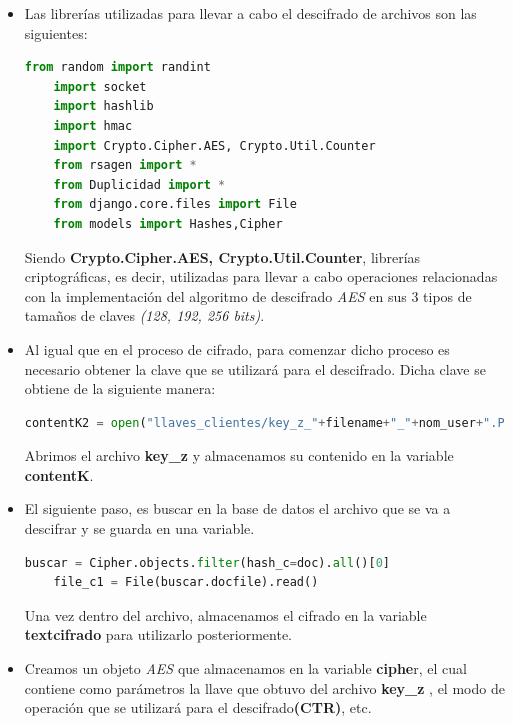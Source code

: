 \begin{itemize}
	\item Las librerías utilizadas para llevar a cabo el descifrado de archivos son las siguientes: 
			
\begin{lstlisting}[language=Python,frame=single, keywordstyle=\color{blue},breaklines=true,showstringspaces=false]
	from random import randint
	import socket
	import hashlib
	import hmac
	import Crypto.Cipher.AES, Crypto.Util.Counter
	from rsagen import *
	from Duplicidad import *
	from django.core.files import File
	from models import Hashes,Cipher
\end{lstlisting}

Siendo \textbf{Crypto.Cipher.AES, Crypto.Util.Counter}, librerías criptográficas, es decir, utilizadas para llevar a cabo operaciones relacionadas con la implementación del algoritmo de descifrado \textit{AES} en sus 3 tipos de tamaños de claves \textit{(128, 192, 256 bits)}. 

	\item Al igual que en el proceso de cifrado, para comenzar dicho proceso es necesario obtener la clave que se utilizará para el descifrado. Dicha clave se obtiene de la siguiente manera:  

\begin{lstlisting}[language=Python,frame=single, keywordstyle=\color{blue},breaklines=true,showstringspaces=false]
    contentK2 = open("llaves_clientes/key_z_"+filename+"_"+nom_user+".PEM", "rb").read()
\end{lstlisting}

Abrimos el archivo \textbf{key\_z} y almacenamos su contenido en la variable \textbf{contentK}. 

		\item El siguiente paso, es buscar en la base de datos el archivo que se va a descifrar y se guarda en una variable. 
			
\begin{lstlisting}[language=Python,frame=single, keywordstyle=\color{blue},breaklines=true,showstringspaces=false]
    buscar = Cipher.objects.filter(hash_c=doc).all()[0]
    file_c1 = File(buscar.docfile).read()
\end{lstlisting}

Una vez dentro del archivo, almacenamos el cifrado en la variable \textbf{textcifrado} para utilizarlo posteriormente. 

		\item Creamos un objeto \textit{AES} que almacenamos en la variable \textbf{ciphe}r, el cual contiene como parámetros la llave que obtuvo del archivo \textbf{key\_z }, el modo de operación que se utilizará para el descifrado\textbf{(CTR)}, etc.
			

\end{itemize}
